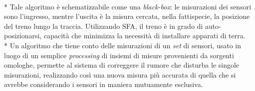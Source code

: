 \\*
Tale algoritmo \`e schematizzabile come una \emph{black-box}: le misurazioni dei sensori sono l'ingresso, mentre l'uscita \`e la misura cercata, nella fattispecie, la posizione del treno lungo la traccia.
Utilizzando SFA, il treno \`e in grado di auto-posizionarsi, capacit\`a che minimizza la necessit\`a di installare apparati di terra.\\*
Un algoritmo che tiene conto delle misurazioni di un \emph{set} di sensori, usato in luogo di un semplice \emph{processing} di insiemi di misure provenienti da sorgenti omologhe, permette al sistema di correggere il rumore che disturba le singole misurazioni, realizzando cos\`i una nuova misura pi\`u accurata di quella che si avrebbe considerando i sensori in maniera mutuamente esclusiva.